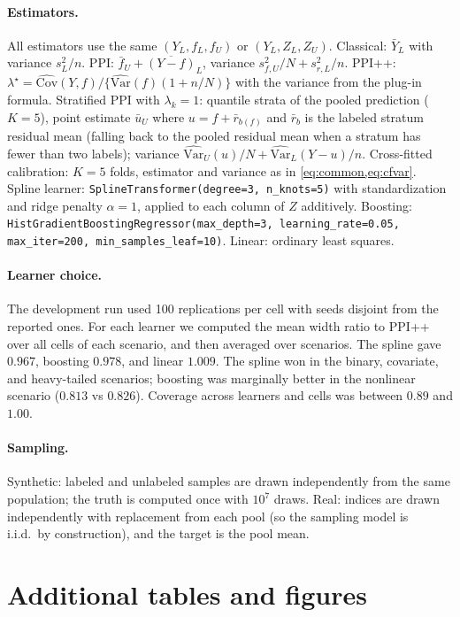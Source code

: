 \paragraph{Estimators.}
All estimators use the same $(Y_L,f_L,f_U)$ or $(Y_L,Z_L,Z_U)$. Classical: $\bar Y_L$ with variance $s_L^2/n$. PPI: $\bar f_U+\overline{(Y-f)}_L$, variance $s^2_{f,U}/N+s^2_{r,L}/n$. PPI++: $\lambda^\star=\widehat{\mathrm{Cov}}(Y,f)/\{\widehat{\mathrm{Var}}(f)(1+n/N)\}$ with the variance from the plug-in formula. Stratified PPI \citep{fisch2024strat} with $\lambda_k=1$: quantile strata of the pooled prediction ($K=5$), point estimate $\bar u_U$ where $u=f+\bar r_{b(f)}$ and $\bar r_b$ is the labeled stratum residual mean (falling back to the pooled residual mean when a stratum has fewer than two labels); variance $\widehat{\mathrm{Var}}_U(u)/N+\widehat{\mathrm{Var}}_L(Y-u)/n$. Cross-fitted calibration: $K=5$ folds, estimator and variance as in \cref{eq:common,eq:cfvar}. Spline learner: \texttt{SplineTransformer(degree=3, n\_knots=5)} with standardization and ridge penalty $\alpha=1$, applied to each column of $Z$ additively. Boosting: \texttt{HistGradientBoostingRegressor(max\_depth=3, learning\_rate=0.05, max\_iter=200, min\_samples\_leaf=10)}. Linear: ordinary least squares.

\paragraph{Learner choice.}
The development run used 100 replications per cell with seeds disjoint from the reported ones. For each learner we computed the mean width ratio to PPI++ over all cells of each scenario, and then averaged over scenarios. The spline gave $0.967$, boosting $0.978$, and linear $1.009$. The spline won in the binary, covariate, and heavy-tailed scenarios; boosting was marginally better in the nonlinear scenario ($0.813$ vs $0.826$). Coverage across learners and cells was between $0.89$ and $1.00$.

\paragraph{Sampling.}
Synthetic: labeled and unlabeled samples are drawn independently from the same population; the truth is computed once with $10^7$ draws. Real: indices are drawn independently with replacement from each pool (so the sampling model is i.i.d.\ by construction), and the target is the pool mean.

\section{Additional tables and figures}
\label{app:tables}

